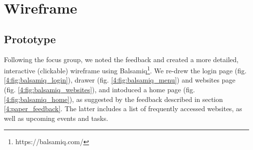 \section{Wireframe} \label{4:wireframe}

\subsection{Prototype} \label{4:wireframe_prototype}

Following the focus group, we noted the feedback and created a more detailed, interactive (clickable) wireframe using Balsamiq\footnote{https://balsamiq.com/}. We re-drew the login page (fig. \ref{4:fig:balsamiq_login}), drawer (fig. \ref{4:fig:balsamiq_menu}) and websites page (fig. \ref{4:fig:balsamiq_websites}), and intoduced a home page (fig. \ref{4:fig:balsamiq_home}), as suggested by the feedback described in section \ref{4:paper_feedback}. The latter includes a list of frequently accessed websites, as well as upcoming events and tasks.

